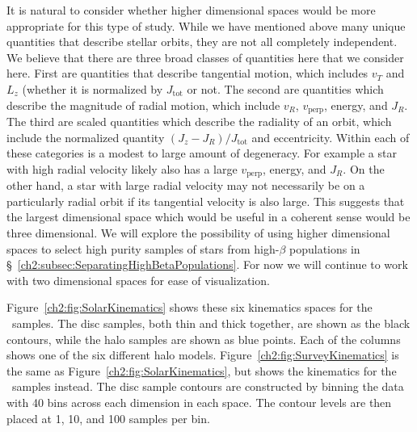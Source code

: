 It is natural to consider whether higher dimensional spaces would be more appropriate for this type of study. While we have mentioned above many unique quantities that describe stellar orbits, they are not all completely independent. We believe that there are three broad classes of quantities here that we consider here. First are quantities that describe tangential motion, which includes $v_{T}$ and $L_{z}$ (whether it is normalized by $J_\mathrm{tot}$ or not. The second are quantities which describe the magnitude of radial motion, which include $v_{R}$, $v_\mathrm{perp}$, energy, and $J_{R}$. The third are scaled quantities which describe the radiality of an orbit, which include the normalized quantity $(J_{z}-J_{R})/J_\mathrm{tot}$ and eccentricity. Within each of these categories is a modest to large amount of degeneracy. For example a star with high radial velocity likely also has a large $v_\mathrm{perp}$, energy, and $J_{R}$. On the other hand, a star with large radial velocity may not necessarily be on a particularly radial orbit if its tangential velocity is also large. This suggests that the largest dimensional space which would be useful in a coherent sense would be three dimensional. We will explore the possibility of using higher dimensional spaces to select high purity samples of stars from high-$\beta$ populations in \S~\ref{ch2:subsec:SeparatingHighBetaPopulations}. For now we will continue to work with two dimensional spaces for ease of visualization.


Figure~\ref{ch2:fig:SolarKinematics} shows these six kinematics spaces for the \solar\ samples. The disc samples, both thin and thick together, are shown as the black contours, while the halo samples are shown as blue points. Each of the columns shows one of the six different halo models. Figure~\ref{ch2:fig:SurveyKinematics} is the same as Figure~\ref{ch2:fig:SolarKinematics}, but shows the kinematics for the \survey\ samples instead. The disc sample contours are constructed by binning the data with 40 bins across each dimension in each space. The contour levels are then placed at 1, 10, and 100 samples per bin. 


